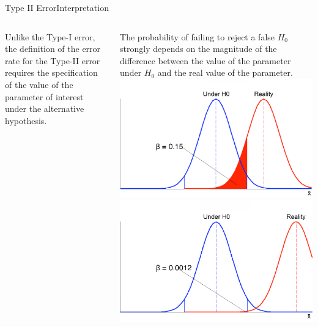 \begin{frame}{Type II Error}{Interpretation}
  \begin{columns}
    Unlike the Type-I error, the definition of the error rate for the Type-II error requires the specification of the value of the parameter of interest under the alternative hypothesis.
    \bigskip

    The probability of failing to reject a false $H_0$ strongly depends on the magnitude of the difference between the value of the parameter under $H_0$ and the real value of the parameter.
    \includegraphics[width=\textwidth]{../img/beta-a}\\
    \includegraphics[width=\textwidth]{../img/beta-d}
  \end{columns}
\end{frame}


